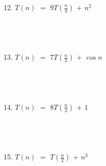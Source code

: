 \documentclass[12pt]{article}
\begin{document}
12. $T(n)$ $=$ $9T(\frac{n}{3})$ $+$ $n^2$\\\\\\\\\\
13. $T(n)$ $=$ $7T(\frac{n}{3})$ $+$ $\cos{n}$\\\\\\\\\\
14. $T(n)$ $=$ $8T(\frac{n}{3})$ $+$ $1$\\\\\\\\\\
15. $T(n)$ $=$ $T(\frac{n}{2})$ $+$ $n^3$\\\\\\\\\\
\end{document}
